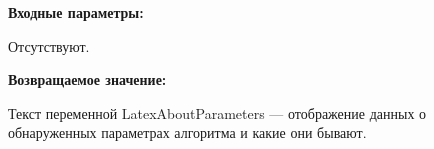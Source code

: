 \textbf{Входные параметры:}

Отсутствуют.

\textbf{Возвращаемое значение:}

Текст переменной LatexAboutParameters --- отображение данных о обнаруженных параметрах алгоритма и какие они бывают.